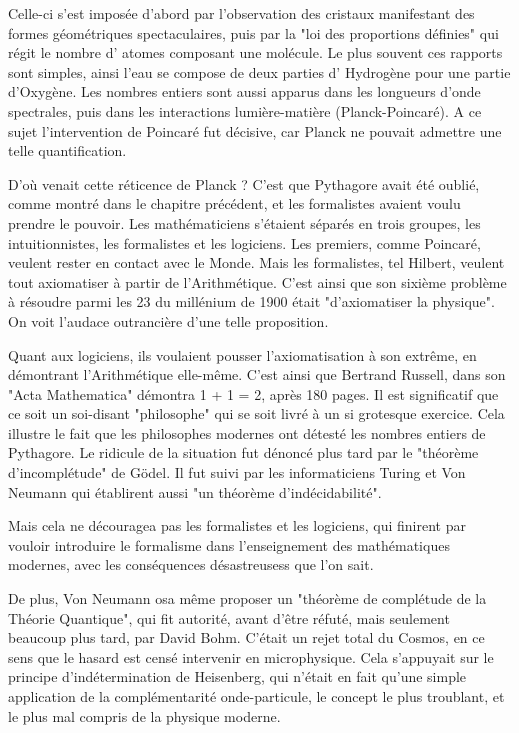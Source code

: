 \documentclass[a4paper,12pt]{article}
\begin{document}
Celle-ci s'est imposée d'abord par l'observation des cristaux manifestant des formes géométriques spectaculaires, puis par la "loi des proportions définies" qui régit le nombre d' atomes composant une molécule. Le plus souvent ces rapports sont simples, ainsi l'eau se compose de deux parties d' Hydrogène pour une partie d'Oxygène. Les nombres entiers sont aussi apparus dans les longueurs d'onde spectrales, puis dans les interactions lumière-matière (Planck-Poincaré). A ce sujet l'intervention de Poincaré fut décisive, car Planck ne pouvait admettre une telle quantification.

D'où venait cette réticence de Planck ? C'est que Pythagore avait été oublié, comme montré dans le chapitre précédent, et les formalistes avaient voulu prendre le pouvoir. Les mathématiciens s'étaient séparés en trois groupes, les intuitionnistes, les formalistes et les logiciens. Les premiers, comme Poincaré, veulent rester en contact avec le Monde. Mais les formalistes, tel Hilbert, veulent tout axiomatiser à partir de l'Arithmétique. C'est ainsi que son sixième problème à résoudre parmi les 23 du millénium de 1900 était "d'axiomatiser la physique". On voit l'audace outrancière d'une telle proposition. 

Quant aux logiciens, ils voulaient pousser l'axiomatisation à son extrême, en démontrant l'Arithmétique elle-même. C'est ainsi que Bertrand Russell, dans son "Acta Mathematica" démontra 1 + 1 = 2, après 180 pages. Il est significatif que ce soit un soi-disant "philosophe" qui se soit livré à un si grotesque exercice. Cela illustre le fait que les philosophes modernes ont détesté les nombres entiers de Pythagore. Le ridicule de la situation fut dénoncé plus tard par le "théorème d'incomplétude" de Gödel. Il fut suivi par les informaticiens Turing et Von Neumann qui établirent aussi "un théorème d'indécidabilité". 

Mais cela ne découragea pas les formalistes et les logiciens, qui finirent par vouloir introduire le formalisme dans l'enseignement des mathématiques modernes, avec les conséquences désastreusess que l'on sait. 

De plus, Von Neumann osa même proposer un "théorème de complétude de la Théorie Quantique", qui fit autorité, avant d'être réfuté, mais seulement beaucoup plus tard, par David Bohm. C'était un rejet total du Cosmos, en ce sens que le hasard est censé intervenir en microphysique. Cela s'appuyait sur le principe d'indétermination de Heisenberg, qui n'était en fait qu'une simple application de la complémentarité onde-particule, le concept le plus troublant, et le plus mal compris de la physique moderne.
\end{document}

